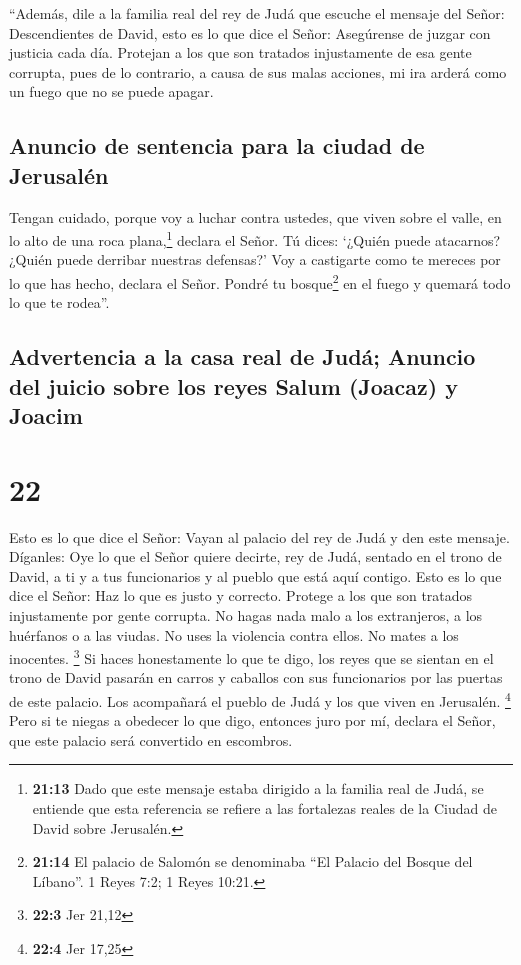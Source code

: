  ``Además, dile a la familia real del rey de Judá que
escuche el mensaje del Señor:  Descendientes de David,
esto es lo que dice el Señor: Asegúrense de juzgar con justicia cada
día. Protejan a los que son tratados injustamente de esa gente corrupta,
pues de lo contrario, a causa de sus malas acciones, mi ira arderá como
un fuego que no se puede apagar.

\hypertarget{anuncio-de-sentencia-para-la-ciudad-de-jerusaluxe9n}{%
\subsection{Anuncio de sentencia para la ciudad de
Jerusalén}\label{anuncio-de-sentencia-para-la-ciudad-de-jerusaluxe9n}}

 Tengan cuidado, porque voy a luchar contra ustedes, que
viven sobre el valle, en lo alto de una roca plana,\footnote{\textbf{21:13}
  Dado que este mensaje estaba dirigido a la familia real de Judá, se
  entiende que esta referencia se refiere a las fortalezas reales de la
  Ciudad de David sobre Jerusalén.} declara el Señor. Tú dices: `¿Quién
puede atacarnos? ¿Quién puede derribar nuestras defensas?'
 Voy a castigarte como te mereces por lo que has hecho,
declara el Señor. Pondré tu bosque\footnote{\textbf{21:14} El palacio de
  Salomón se denominaba ``El Palacio del Bosque del Líbano''. 1 Reyes
  7:2; 1 Reyes 10:21.} en el fuego y quemará todo lo que te rodea''.

\hypertarget{advertencia-a-la-casa-real-de-juduxe1-anuncio-del-juicio-sobre-los-reyes-salum-joacaz-y-joacim}{%
\subsection{Advertencia a la casa real de Judá; Anuncio del juicio sobre
los reyes Salum (Joacaz) y
Joacim}\label{advertencia-a-la-casa-real-de-juduxe1-anuncio-del-juicio-sobre-los-reyes-salum-joacaz-y-joacim}}

\hypertarget{section-21}{%
\section{22}\label{section-21}}

 Esto es lo que dice el Señor: Vayan al palacio del rey de
Judá y den este mensaje.  Díganles: Oye lo que el Señor
quiere decirte, rey de Judá, sentado en el trono de David, a ti y a tus
funcionarios y al pueblo que está aquí contigo.  Esto es
lo que dice el Señor: Haz lo que es justo y correcto. Protege a los que
son tratados injustamente por gente corrupta. No hagas nada malo a los
extranjeros, a los huérfanos o a las viudas. No uses la violencia contra
ellos. No mates a los inocentes. \footnote{\textbf{22:3} Jer 21,12}
 Si haces honestamente lo que te digo, los reyes que se
sientan en el trono de David pasarán en carros y caballos con sus
funcionarios por las puertas de este palacio. Los acompañará el pueblo
de Judá y los que viven en Jerusalén. \footnote{\textbf{22:4} Jer 17,25}
 Pero si te niegas a obedecer lo que digo, entonces juro
por mí, declara el Señor, que este palacio será convertido en escombros.

